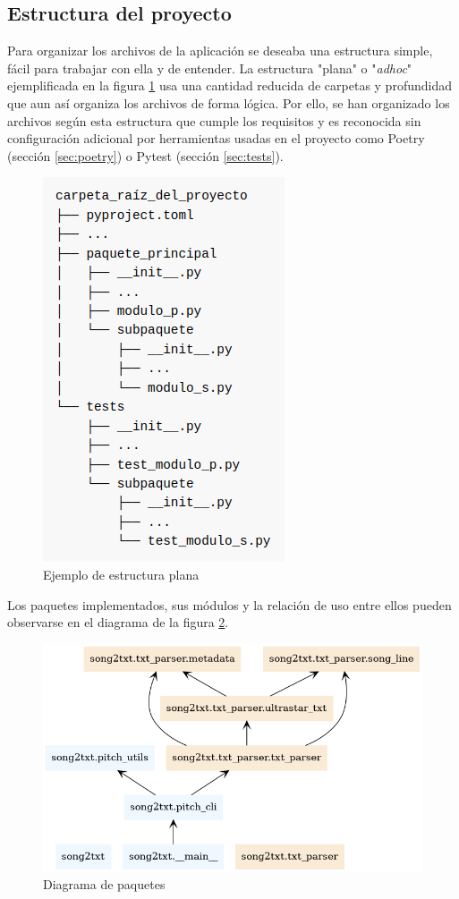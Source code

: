 \subsection{Estructura del proyecto}
Para organizar los archivos de la aplicación se deseaba una estructura simple, fácil para trabajar con ella y de entender.  La estructura "plana" o "\textit{adhoc}"  ejemplificada en la figura \ref{fig:layout1} usa una cantidad reducida de carpetas y profundidad que aun así organiza los archivos de forma lógica.  Por ello, se han organizado los archivos según esta estructura  que cumple los requisitos y es reconocida sin configuración adicional por herramientas usadas en el proyecto como Poetry (sección \ref{sec:poetry}) o Pytest (sección \ref{sec:tests}).

\begin{figure}[h]
	\centering
	\includegraphics[width=0.5\linewidth]{logos/layout.png}
	\caption{Ejemplo de estructura plana}
	\label{fig:layout1}
\end{figure}


Los paquetes implementados, sus módulos y la relación de uso entre ellos pueden observarse en el diagrama de la figura \ref{fig:modules1}.


\begin{figure}[h!]
	\includegraphics[width=\linewidth]{logos/packages.png}
	\caption{Diagrama de paquetes}
	\label{fig:modules1}
\end{figure}


